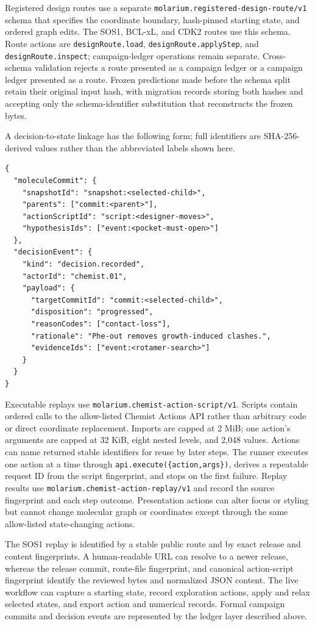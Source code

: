 \documentclass[11pt]{article}
\begin{document}
\begin{small}
Registered design routes use a separate \texttt{molarium.registered-design-route/v1} schema that specifies the coordinate boundary, hash-pinned starting state, and ordered graph edits. The SOS1, BCL-xL, and CDK2 routes use this schema. Route actions are \texttt{designRoute.load}, \texttt{designRoute.applyStep}, and \texttt{designRoute.inspect}; campaign-ledger operations remain separate. Cross-schema validation rejects a route presented as a campaign ledger or a campaign ledger presented as a route. Frozen predictions made before the schema split retain their original input hash, with migration records storing both hashes and accepting only the schema-identifier substitution that reconstructs the frozen bytes.

A decision-to-state linkage has the following form; full identifiers are SHA-256-derived values rather than the abbreviated labels shown here.

\begin{lstlisting}
{
  "moleculeCommit": {
    "snapshotId": "snapshot:<selected-child>",
    "parents": ["commit:<parent>"],
    "actionScriptId": "script:<designer-moves>",
    "hypothesisIds": ["event:<pocket-must-open>"]
  },
  "decisionEvent": {
    "kind": "decision.recorded",
    "actorId": "chemist.01",
    "payload": {
      "targetCommitId": "commit:<selected-child>",
      "disposition": "progressed",
      "reasonCodes": ["contact-loss"],
      "rationale": "Phe-out removes growth-induced clashes.",
      "evidenceIds": ["event:<rotamer-search>"]
    }
  }
}
\end{lstlisting}

Executable replays use \texttt{molarium.chemist-action-script/v1}. Scripts contain ordered calls to the allow-listed Chemist Actions API rather than arbitrary code or direct coordinate replacement. Imports are capped at 2 MiB; one action's arguments are capped at 32 KiB, eight nested levels, and 2,048 values. Actions can name returned stable identifiers for reuse by later steps. The runner executes one action at a time through \texttt{api.execute(\{action,args\})}, derives a repeatable request ID from the script fingerprint, and stops on the first failure. Replay results use \texttt{molarium.chemist-action-replay/v1} and record the source fingerprint and each step outcome. Presentation actions can alter focus or styling but cannot change molecular graph or coordinates except through the same allow-listed state-changing actions.

The SOS1 replay is identified by a stable public route and by exact release and content fingerprints. A human-readable URL can resolve to a newer release, whereas the release commit, route-file fingerprint, and canonical action-script fingerprint identify the reviewed bytes and normalized JSON content. The live workflow can capture a starting state, record exploration actions, apply and relax selected states, and export action and numerical records. Formal campaign commits and decision events are represented by the ledger layer described above.


\end{small}
\end{document}
